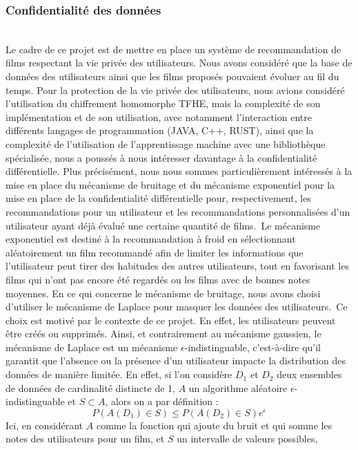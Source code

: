 \documentclass{article}
\begin{document}
    \subsubsection{Confidentialité des données}
    $ $\\
    Le cadre de ce projet est de mettre en place un système de recommandation de films respectant la vie privée des utilisateurs. Nous avons
    considéré que la base de données des utilisateurs ainsi que les films proposés pouvaient évoluer au fil du temps.
    Pour la protection de la vie privée des utilisateurs, nous avions considéré l'utilisation du chiffrement homomorphe TFHE, mais
    la complexité de son implémentation et de son utilisation, avec notamment l'interaction entre différents langages de programmation (JAVA, C++, RUST),
    ainsi que la complexité de l'utilisation de l'apprentissage machine avec une bibliothèque spécialisée, nous a poussés à nous intéresser davantage à la confidentialité différentielle.
    Plus précisément, nous nous sommes particulièrement intéressés à la mise en place du mécanisme de bruitage et du mécanisme exponentiel pour la mise
    en place de la confidentialité différentielle pour, respectivement, les recommandations pour un utilisateur et les recommandations personnalisées
    d'un utilisateur ayant déjà évalué une certaine quantité de films.\
    Le mécanisme exponentiel est destiné à la recommandation à froid en sélectionnant aléatoirement un film recommandé afin de limiter les informations
    que l'utilisateur peut tirer des habitudes des autres utilisateurs, tout en favorisant les films qui n'ont pas encore été regardés ou les films avec de bonnes notes moyennes.
    En ce qui concerne le mécanisme de bruitage, nous avons choisi d'utiliser le mécanisme de Laplace pour masquer les données des utilisateurs.\
    Ce choix est motivé par le contexte de ce projet. En effet, les utilisateurs peuvent être créés ou supprimés. Ainsi, et contrairement au mécanisme gaussien,
    le mécanisme de Laplace est un mécanisme $\epsilon$-indistinguable, c'est-à-dire qu'il garantit que l'absence ou la présence d'un
    utilisateur impacte la distribution des données de manière limitée. En effet, si l'on considère $D_1$ et $D_2$ deux ensembles de données
    de cardinalité distincte de 1, $A$ un algorithme aléatoire $\epsilon$-indistinguable et $S \subset A$, alors on a par définition :
    \begin{equation}
        P(A(D_1) \in S) \leq P(A(D_2) \in S) e^{\epsilon}
    \end{equation}
    Ici, en considérant $A$ comme la fonction qui ajoute du bruit et qui somme les notes des utilisateurs pour un film, et $S$ un intervalle de valeurs possibles,
\end{document}
